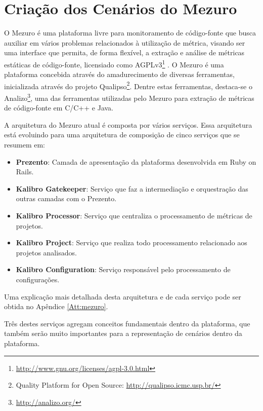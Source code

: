 \section{Criação dos Cenários do Mezuro}
\label{mezuro-cenarios}

O Mezuro é uma plataforma livre para monitoramento de código-fonte que busca auxiliar em vários problemas relacionados à utilização de métrica, visando ser uma interface que permita, de forma flexível, a extração e análise de métricas estáticas de código-fonte, licensiado como AGPLv3\footnote{\url{http://www.gnu.org/licenses/agpl-3.0.html}} \cite{manzo2014}. O Mezuro é uma plataforma concebida através do amadurecimento de diversas ferramentas, inicializada através do projeto Qualipso\footnote{Quality Platform for Open Source: \url{http://qualipso.icmc.usp.br/}}. Dentre estas ferramentas, destaca-se o Analizo\footnote{\url{http://analizo.org/}}, uma das ferramentas utilizadas pelo Mezuro para extração de métricas de código-fonte em C/C++ e Java.

A arquitetura do Mezuro atual é composta por vários serviços. Essa arquitetura está evoluindo para uma arquitetura de composição de cinco serviços que se resumem em:

\begin{itemize}
\item \textbf{Prezento}: Camada de apresentação da plataforma desenvolvida em Ruby on Rails.

\item \textbf{Kalibro Gatekeeper}: Serviço que faz a intermediação e orquestração das outras camadas com o Prezento.

\item \textbf{Kalibro Processor}: Serviço que centraliza o processamento de métricas de projetos.

\item \textbf{Kalibro Project}: Serviço que realiza todo processamento relacionado aos projetos analisados.

\item \textbf{Kalibro Configuration}: Serviço responsável pelo processamento de configurações.
\end{itemize}

Uma explicação mais detalhada desta arquitetura e de cada serviço pode ser obtida no Apêndice \ref{Att:mezuro}.

Três destes serviços agregam conceitos fundamentais dentro da plataforma, que também serão muito importantes para a representação de cenários dentro da plataforma. 

